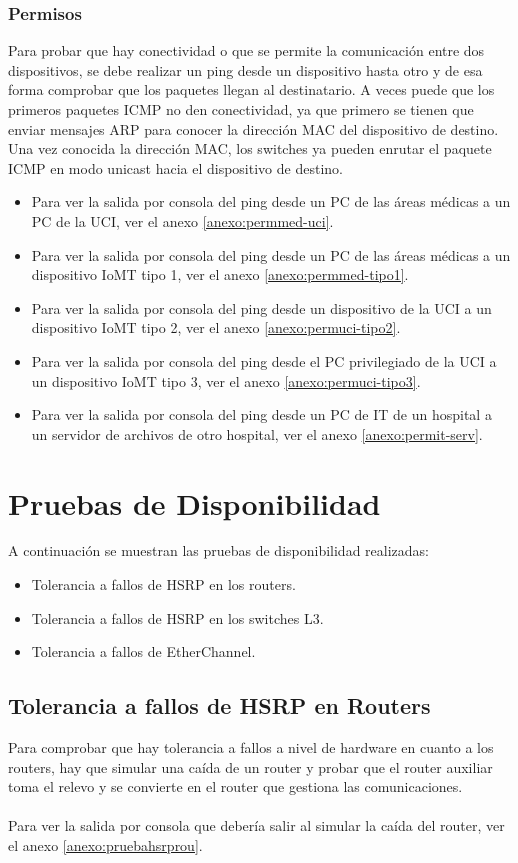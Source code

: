 \subsubsection{Permisos}
Para probar que hay conectividad o que se permite la comunicación entre dos dispositivos, se debe realizar un ping desde un dispositivo hasta otro y de esa forma comprobar que los paquetes llegan al destinatario. A veces puede que los primeros paquetes \ac{ICMP} no den conectividad, ya que primero se tienen que enviar mensajes ARP para conocer la dirección MAC 
del dispositivo de destino. Una vez conocida la dirección MAC, los switches ya pueden enrutar el paquete ICMP en modo unicast hacia el dispositivo de destino.
\begin{itemize}
    \item Para ver la salida por consola del ping desde un PC de las áreas médicas a un PC de la UCI, ver el anexo \ref{anexo:permmed-uci}.
    \item Para ver la salida por consola del ping desde un PC de las áreas médicas a un dispositivo IoMT tipo 1, ver el anexo \ref{anexo:permmed-tipo1}.
    \item Para ver la salida por consola del ping desde un dispositivo de la UCI a un dispositivo IoMT tipo 2, ver el anexo \ref{anexo:permuci-tipo2}.
    \item Para ver la salida por consola del ping desde el PC privilegiado de la UCI a un dispositivo IoMT tipo 3, ver el anexo \ref{anexo:permuci-tipo3}.
    \item Para ver la salida por consola del ping desde un PC de IT de un hospital a un servidor de archivos de otro hospital, ver el anexo \ref{anexo:permit-serv}.
\end{itemize}

\section{Pruebas de Disponibilidad}
A continuación se muestran las pruebas de disponibilidad realizadas:
\begin{itemize}
    \item Tolerancia a fallos de HSRP en los routers.
    \item Tolerancia a fallos de HSRP en los switches L3.
    \item Tolerancia a fallos de EtherChannel.
\end{itemize}

\subsection{Tolerancia a fallos de HSRP en Routers}
Para comprobar que hay tolerancia a fallos a nivel de hardware en cuanto a los routers, hay que simular una caída de un router y probar que el router auxiliar toma el relevo y se convierte en 
el router que gestiona las comunicaciones.
\\ \\ 
Para ver la salida por consola que debería salir al simular la caída del router, ver el anexo \ref{anexo:pruebahsrprou}.

